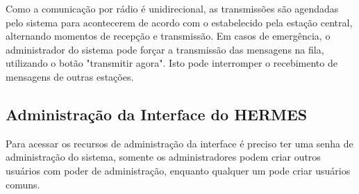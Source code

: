 \documentclass[11pt,a4paper]{article}
\begin{document}



Como a comunicação por rádio é unidirecional, as transmissões são agendadas pelo sistema para acontecerem de acordo com o estabelecido pela estação central, alternando momentos de recepção e transmissão. Em casos de emergência, o administrador do sistema pode forçar a transmissão das mensagens na fila, utilizando o botão "transmitir agora". Isto pode interromper o recebimento de mensagens de outras estações.




\subsection{Administração da Interface do HERMES}

Para acessar os recursos de administração da interface é preciso ter uma senha de administração do sistema, somente os administradores podem criar outros usuários com poder de administração, enquanto qualquer um pode criar usuários comuns.
\end{document}

